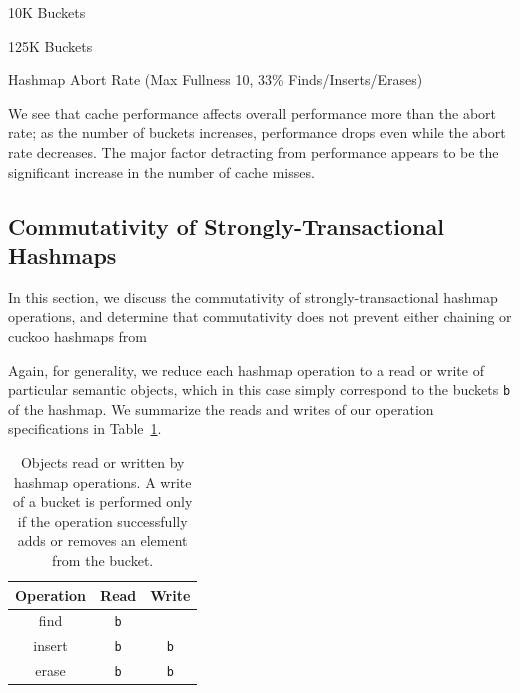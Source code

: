     \begin{table}[t]
    \centering
	\singlespace
        \begin{minipage}{0.5\textwidth}
        \centering
        
        \caption*{10K Buckets}
            \vspace{12pt}
        \end{minipage}
        \begin{minipage}{0.5\textwidth}
        \centering
        
        \caption*{125K Buckets}
        \end{minipage}
        \caption{Hashmap Abort Rate (Max Fullness 10, 33\% Finds/Inserts/Erases)}
		\label{tab:hm_aborts}
    \end{table}

We see that cache performance affects overall performance more than the abort rate; as the number of buckets increases, performance drops even while the abort rate decreases. The major factor detracting from performance appears to be the significant increase in the number of cache misses.

\vspace{12pt}
\noindent{}

\subsection{Commutativity of Strongly-Transactional Hashmaps}
\label{hm_deps}

In this section, we discuss the commutativity of strongly-transactional hashmap operations, and determine that commutativity does not prevent either chaining or cuckoo hashmaps from  

Again, for generality, we reduce each hashmap operation to a read or write of particular semantic objects, which in this case simply correspond to the buckets \texttt{b} of the hashmap. We summarize the reads and writes of our operation specifications in Table~\ref{table:hmrw}.

\begin{table}[t]
\centering
\begin{tabular}{c||c|c}
    Operation & Read & Write\\
    \hline
    find & \texttt{b} & \\
    insert & \texttt{b} & \texttt{b} \\
    erase & \texttt{b} & \texttt{b}
\end{tabular}
    \caption[Objects read or written by hashmap operations]{Objects read or written by hashmap operations. A write of a bucket is performed only if the operation successfully adds or removes an element from the bucket.}
    \label{table:hmrw}
\end{table}


